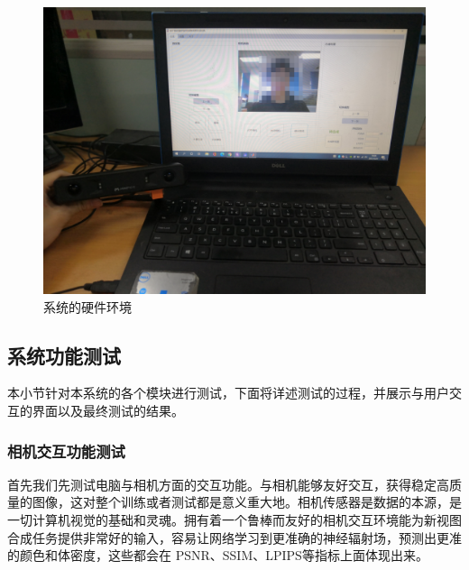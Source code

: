 \begin{figure}[htbp]
	\centering
	\includegraphics[width=0.85\linewidth]{figures/system-hardware.jpg}
	\caption{系统的硬件环境}
	\label{fig:photo}
\end{figure}
\pagebreak
\subsection{系统功能测试}
本小节针对本系统的各个模块进行测试，下面将详述测试的过程，并展示与用户交互的界面以及最终测试的结果。
\subsubsection{相机交互功能测试}
首先我们先测试电脑与相机方面的交互功能。与相机能够友好交互，获得稳定高质量的图像，这对整个训练或者测试都是意义重大地。相机传感器是数据的本源，是一切计算机视觉的基础和灵魂。拥有着一个鲁棒而友好的相机交互环境能为新视图合成任务提供非常好的输入，容易让网络学习到更准确的神经辐射场，预测出更准的颜色和体密度，这些都会在 PSNR、SSIM、LPIPS等指标上面体现出来。

